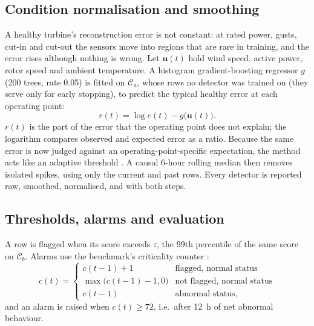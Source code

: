 \documentclass[conference]{IEEEtran}
\begin{document}
\subsection{Condition normalisation and smoothing}
A healthy turbine's reconstruction error is not constant: at rated power, gusts, cut-in and cut-out the sensors move into regions that are rare in training, and the error rises although nothing is wrong. Let $\mathbf{u}(t)$ hold wind speed, active power, rotor speed and ambient temperature. A histogram gradient-boosting regressor $g$ (200 trees, rate 0.05) is fitted on $\mathcal{C}_a$, whose rows no detector was trained on (they serve only for early stopping), to predict the typical healthy error at each operating point:
\begin{equation}
r(t)=\log e(t)-g\big(\mathbf{u}(t)\big).
\end{equation}
$r(t)$ is the part of the error that the operating point does not explain; the logarithm compares observed and expected error as a ratio. Because the same error is now judged against an operating-point-specific expectation, the method acts like an adaptive threshold \cite{r12}. A causal 6-hour rolling median then removes isolated spikes, using only the current and past rows. Every detector is reported raw, smoothed, normalised, and with both steps.

\subsection{Thresholds, alarms and evaluation}
A row is flagged when its score exceeds $\tau$, the 99th percentile of the same score on $\mathcal{C}_b$. Alarms use the benchmark's criticality counter \cite{r12}:
\begin{equation}
c(t)=\begin{cases} c(t-1)+1 & \text{flagged, normal status}\\ \max\big(c(t-1)-1,0\big) & \text{not flagged, normal status}\\ c(t-1) & \text{abnormal status,}\end{cases}
\end{equation}
and an alarm is raised when $c(t)\ge72$, i.e.\ after 12~h of net abnormal behaviour.
\end{document}
